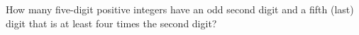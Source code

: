 How many five-digit positive integers have an odd second digit and a fifth (last) digit that is at least four times the second digit?
